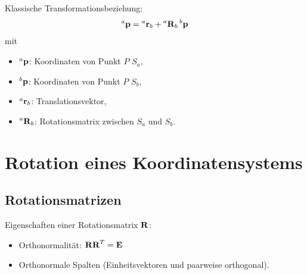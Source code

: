		Klassische Transformationsbeziehung:
		\begin{equation*}
			\prescript{a}{}{\boldsymbol{\mathrm{p}}} = \prescript{a}{}{\boldsymbol{\mathrm{r}}}_b + \prescript{a}{}{\boldsymbol{\mathrm{R}}}_b \prescript{b}{}{\boldsymbol{\mathrm{p}}}
		\end{equation*}
		mit
		\begin{itemize}
			\item \( \prescript{a}{}{\boldsymbol{\mathrm{p}}} \):   \tabto{1cm} Koordinaten von Punkt \(P\) \bzgl \(S_a\),
			\item \( \prescript{b}{}{\boldsymbol{\mathrm{p}}} \):   \tabto{1cm} Koordinaten von Punkt \(P\) \bzgl \(S_b\),
			\item \( \prescript{a}{}{\boldsymbol{\mathrm{r}}}_b \): \tabto{1cm} Translationsvektor,
			\item \( \prescript{a}{}{\boldsymbol{\mathrm{R}}}_b \): \tabto{1cm} Rotationsmatrix zwischen \(S_a\) und \(S_b\).
		\end{itemize}

	\section{Rotation eines Koordinatensystems}
		\subsection{Rotationsmatrizen}
			Eigenschaften einer Rotationsmatrix \( \boldsymbol{\mathrm{R}} \):
			\begin{itemize}
				\item Orthonormalität: \( \boldsymbol{\mathrm{R}} \boldsymbol{\mathrm{R}}^T = \boldsymbol{\mathrm{E}} \)
				\item Orthonormale Spalten (\dh Einheitsvektoren und paarweise orthogonal).
			\end{itemize}
		
